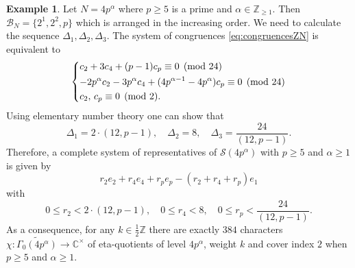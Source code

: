 \documentclass[12pt]{amsart}
\numberwithin{equation}{section}
\theoremstyle{plain}
\theoremstyle{definition}
\newtheorem{examp}[thm]{Example}
\theoremstyle{remark}
\newcommand\numZ{\mathbb{Z}}
\newcommand\numC{\mathbb{C}}
\newcommand\numgeq[2]{\mathbb{#1}_{\geq #2}}
\begin{document}
\begin{examp}
\label{examp:Nis4palpha}
Let $N=4p^\alpha$ where $p\geq5$ is a prime and $\alpha\in\numgeq{Z}{1}$. Then $\mathscr{B}_N=\{2^1,2^2,p\}$ which is arranged in the increasing order. We need to calculate the sequence $\Delta_1,\Delta_2,\Delta_3$. The system of congruences \eqref{eq:congruencesZN} is equivalent to
\begin{equation*}
\begin{dcases}
c_2+3c_4+(p-1)c_p\equiv0\pmod{24}\\
-2p^\alpha c_2-3p^\alpha c_4+(4p^{\alpha-1}-4p^\alpha)c_p\equiv0\pmod{24}\\
c_2,\,c_p\equiv0\pmod{2}.
\end{dcases}
\end{equation*}
Using elementary number theory one can show that
\begin{equation*}
\Delta_1=2\cdot(12,p-1),\quad \Delta_2=8,\quad \Delta_3=\frac{24}{(12,p-1)}.
\end{equation*}
Therefore, a complete system of representatives of $\mathscr{S}(4p^\alpha)$ with $p\geq5$ and $\alpha\geq1$ is given by
\begin{equation*}
r_{2}e_{2}+r_{4}e_{4}+r_pe_p-(r_2+r_4+r_p)e_1
\end{equation*}
with
\begin{equation*}
0\leq r_2<2\cdot(12,p-1),\quad 0\leq r_{4}<8,\quad 0\leq r_{p}<\frac{24}{(12,p-1)}.
\end{equation*}
As a consequence, for any $k\in\frac{1}{2}\numZ$ there are exactly $384$ characters $\chi\colon\widetilde{\Gamma_0(4p^\alpha)}\to\numC^\times$ of eta-quotients of level $4p^\alpha$, weight $k$ and cover index $2$ when $p\geq5$ and $\alpha\geq1$.
\end{examp}
\end{document}
